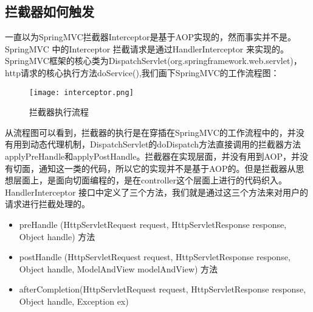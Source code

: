 \documentclass[../../../interview-questions.tex]{subfiles}
\begin{document}
\subsection{拦截器如何触发}

一直以为SpringMVC拦截器Interceptor是基于AOP实现的，然而事实并不是。 SpringMVC 中的Interceptor 拦截请求是通过HandlerInterceptor 来实现的。SpringMVC框架的核心类为DispatchServlet(org.springframework.web.servlet)，http请求的核心执行方法doService(),我们画下SpringMVC的工作流程图：

\begin{figure}[htbp]
	\centering
	\texttt{[image: interceptor.png]}
	\caption{拦截器执行流程}
	\label{fig:interceptor}
\end{figure}

从流程图可以看到，拦截器的执行是在穿插在SpringMVC的工作流程中的，并没有用到动态代理机制，DispatchServlet的doDispatch方法直接调用的拦截器方法applyPreHandle和applyPostHandle。拦截器在实现层面，并没有用到AOP，并没有切面，通知这一类的代码，所以它的实现并不是基于AOP的。但是拦截器从思想层面上，是面向切面编程的，是在controller这个层面上进行的代码织入。HandlerInterceptor 接口中定义了三个方法，我们就是通过这三个方法来对用户的请求进行拦截处理的。

\begin{itemize}
	\item {preHandle (HttpServletRequest request, HttpServletResponse response, Object handle) 方法}
	\item {postHandle (HttpServletRequest request, HttpServletResponse response, Object handle, ModelAndView modelAndView) 方法}
	\item {afterCompletion(HttpServletRequest request, HttpServletResponse response, Object handle, Exception ex) }
\end{itemize}
\end{document}
